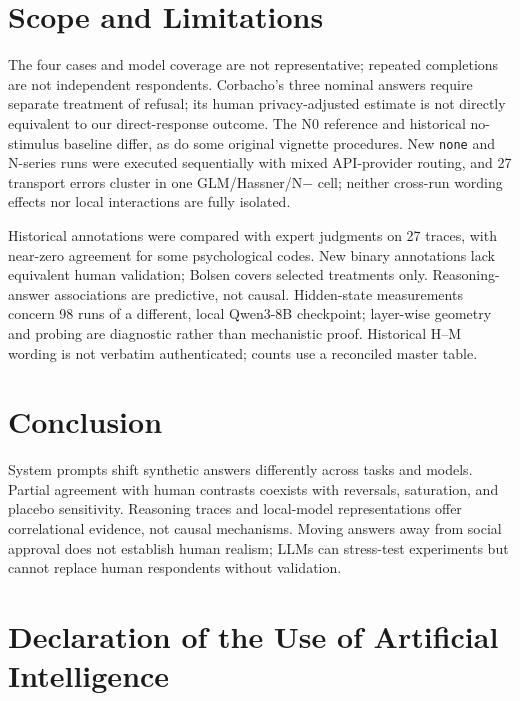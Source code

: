 \documentclass[14pt,a4paper]{extarticle}
\begin{document}
\section{Scope and Limitations}

The four cases and model coverage are not representative; repeated completions are not independent respondents. Corbacho's three nominal answers require separate treatment of refusal; its human privacy-adjusted estimate is not directly equivalent to our direct-response outcome. The N0 reference and historical no-stimulus baseline differ, as do some original vignette procedures. New \texttt{none} and N-series runs were executed sequentially with mixed API-provider routing, and 27 transport errors cluster in one GLM/Hassner/N$-$ cell; neither cross-run wording effects nor local interactions are fully isolated.

Historical annotations were compared with expert judgments on 27 traces, with near-zero agreement for some psychological codes. New binary annotations lack equivalent human validation; Bolsen covers selected treatments only. Reasoning-answer associations are predictive, not causal. Hidden-state measurements concern 98 runs of a different, local Qwen3-8B checkpoint; layer-wise geometry and probing are diagnostic rather than mechanistic proof. Historical H--M wording is not verbatim authenticated; counts use a reconciled master table.

\section{Conclusion}

System prompts shift synthetic answers differently across tasks and models. Partial agreement with human contrasts coexists with reversals, saturation, and placebo sensitivity. Reasoning traces and local-model representations offer correlational evidence, not causal mechanisms. Moving answers away from social approval does not establish human realism; LLMs can stress-test experiments but cannot replace human respondents without validation.


\section*{Declaration of the Use of Artificial Intelligence}
\end{document}
